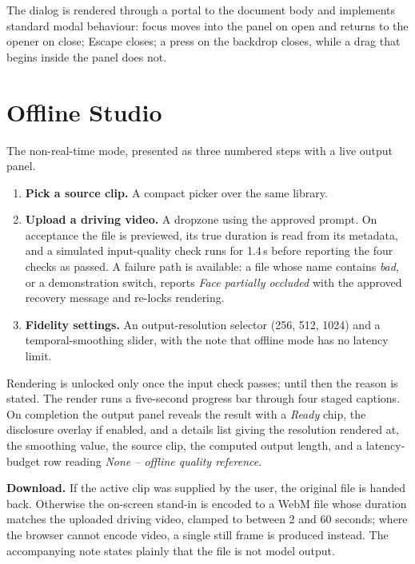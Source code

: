\documentclass[11pt,a4paper]{report}
\begin{document}
The dialog is rendered through a portal to the document body and implements
standard modal behaviour: focus moves into the panel on open and returns to
the opener on close; Escape closes; a press on the backdrop closes, while a
drag that begins inside the panel does not.

\section{Offline Studio}

The non-real-time mode, presented as three numbered steps with a live output
panel.

\begin{enumerate}
  \item \textbf{Pick a source clip.} A compact picker over the same library.
  \item \textbf{Upload a driving video.} A dropzone using the approved prompt.
    On acceptance the file is previewed, its true duration is read from its
    metadata, and a simulated input-quality check runs for 1.4\,s before
    reporting the four checks as passed. A failure path is available: a file
    whose name contains \emph{bad}, or a demonstration switch, reports
    \emph{Face partially occluded} with the approved recovery message and
    re-locks rendering.
  \item \textbf{Fidelity settings.} An output-resolution selector
    (256, 512, 1024) and a temporal-smoothing slider, with the note that
    offline mode has no latency limit.
\end{enumerate}

Rendering is unlocked only once the input check passes; until then the reason
is stated. The render runs a five-second progress bar through four staged
captions. On completion the output panel reveals the result with a
\emph{Ready} chip, the disclosure overlay if enabled, and a details list
giving the resolution rendered at, the smoothing value, the source clip, the
computed output length, and a latency-budget row reading \emph{None -- offline
quality reference}.

\textbf{Download.} If the active clip was supplied by the user, the original
file is handed back. Otherwise the on-screen stand-in is encoded to a WebM
file whose duration matches the uploaded driving video, clamped to between 2
and 60 seconds; where the browser cannot encode video, a single still frame is
produced instead. The accompanying note states plainly that the file is not
model output.
\end{document}

